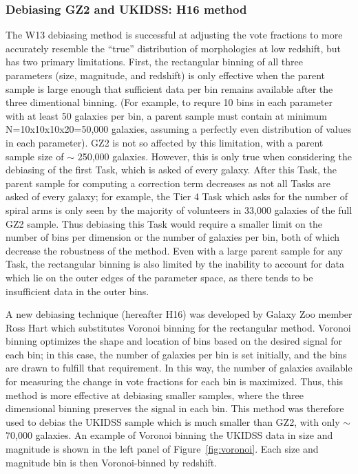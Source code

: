 \subsubsection{Debiasing GZ2 and UKIDSS: H16 method}

The W13 debiasing method is successful at adjusting the vote fractions to more accurately resemble the ``true'' distribution of morphologies at low redshift, but has two primary limitations. First, the rectangular binning of all three parameters (size, magnitude, and redshift) is only effective when the parent sample is large enough that sufficient data per bin remains available after the three dimentional binning. (For example, to requre 10 bins in each parameter with at least 50 galaxies per bin, a parent sample must contain at minimum N=10x10x10x20=50,000 galaxies, assuming a perfectly even distribution of values in each parameter). GZ2 is not so affected by this limitation, with a parent sample size of $\sim$ 250,000 galaxies. However, this is only true when considering the debiasing of the first Task, which is asked of every galaxy. After this Task, the parent sample for computing a correction term decreases as not all Tasks are asked of every galaxy; for example, the Tier 4 Task which asks for the number of spiral arms is only seen by the majority of volunteers in 33,000 galaxies of the full GZ2 sample. Thus debiasing this Task would require a smaller limit on the number of bins per dimension or the number of galaxies per bin, both of which decrease the robustness of the method. Even with a large parent sample for any Task, the rectangular binning is also limited by the inability to account for data which lie on the outer edges of the parameter space, as there tends to be insufficient data in the outer bins. 

A new debiasing technique (hereafter H16) was developed by Galaxy Zoo member Ross Hart \citep{Hart2016} which substitutes Voronoi binning for the rectangular method. Voronoi binning optimizes the shape and location of bins based on the desired signal for each bin; in this case, the number of galaxies per bin is set initially, and the bins are drawn to fulfill that requirement. In this way, the number of galaxies available for measuring the change in vote fractions for each bin is maximized. Thus, this method is more effective at debiasing smaller samples, where the three dimensional binning preserves the signal in each bin. This method was therefore used to debias the UKIDSS sample which is much smaller than GZ2, with only $\sim$70,000 galaxies. An example of Voronoi binning the UKIDSS data in size and magnitude is shown in the left panel of Figure~\ref{fig:voronoi}. Each size and magnitude bin is then Voronoi-binned by redshift. 

